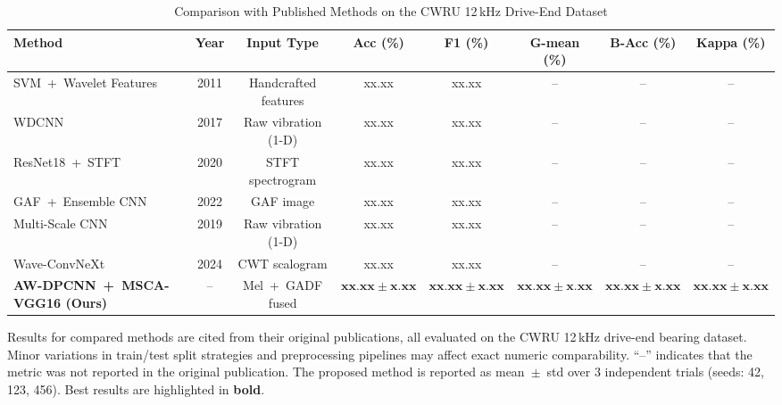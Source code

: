 \begin{table}
	\centering
	\caption{Comparison with Published Methods on the CWRU 12\,kHz Drive-End Dataset}
	\label{tab:external_comparison}
	\renewcommand{\arraystretch}{1.15}
	\small
	\begin{tabular}{l c c c c c c c}
		\toprule
		\textbf{Method} & \textbf{Year} & \textbf{Input Type} & \textbf{Acc (\%)} & \textbf{F1 (\%)} & \textbf{G-mean (\%)} & \textbf{B-Acc (\%)} & \textbf{Kappa (\%)} \\
		\midrule
		SVM~+~Wavelet Features~\cite{kankar2011fault}
			& 2011 & Handcrafted features & xx.xx & xx.xx & -- & -- & -- \\
		WDCNN~\cite{zhang2017wdcnn}
			& 2017 & Raw vibration (1-D) & xx.xx & xx.xx & -- & -- & -- \\
		ResNet18~+~STFT~\cite{li2020stftresnet}
			& 2020 & STFT spectrogram & xx.xx & xx.xx & -- & -- & -- \\
		GAF~+~Ensemble CNN~\cite{han2022bearing}
			& 2022 & GAF image & xx.xx & xx.xx & -- & -- & -- \\
		Multi-Scale CNN~\cite{huang2019improved}
			& 2019 & Raw vibration (1-D) & xx.xx & xx.xx & -- & -- & -- \\
		Wave-ConvNeXt~\cite{zhangWaveConvNeXtEfficientPrecise2024}
			& 2024 & CWT scalogram & xx.xx & xx.xx & -- & -- & -- \\
		\textbf{AW-DPCNN~+~MSCA-VGG16 (Ours)}
			& -- & Mel~+~GADF fused & $\mathbf{xx.xx \pm x.xx}$ & $\mathbf{xx.xx \pm x.xx}$ & $\mathbf{xx.xx \pm x.xx}$ & $\mathbf{xx.xx \pm x.xx}$ & $\mathbf{xx.xx \pm x.xx}$ \\
		\bottomrule
	\end{tabular}

	\vspace{4pt}
	\footnotesize
	Results for compared methods are cited from their original publications, all evaluated on the CWRU 12\,kHz drive-end bearing dataset. Minor variations in train/test split strategies and preprocessing pipelines may affect exact numeric comparability. ``--'' indicates that the metric was not reported in the original publication. The proposed method is reported as mean~$\pm$~std over 3 independent trials (seeds: 42, 123, 456). Best results are highlighted in \textbf{bold}.
\end{table}
